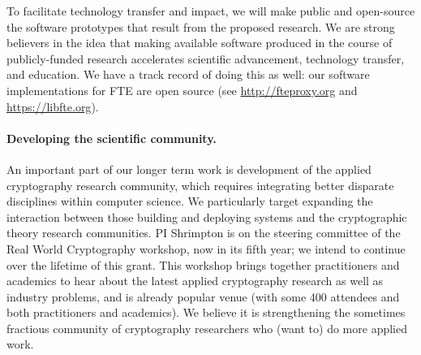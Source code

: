 To facilitate technology transfer and impact, 
we will make public and open-source the software prototypes that result from the
proposed research. We are strong believers in the idea that making available software 
produced in the course of publicly-funded research accelerates scientific
advancement, technology transfer, and education.
We have a track record of doing this as well: 
our software implementations for FTE are open
source (see \url{http://fteproxy.org} and \url{https://libfte.org}). 










\paragraph{Developing the scientific community.} An important part of our longer
term work is development of the applied cryptography research community, which
requires integrating better disparate disciplines within computer science. We
particularly target expanding the interaction between those building and
deploying systems and the cryptographic theory research communities.  PI
Shrimpton is on the steering committee of the Real World
Cryptography workshop, now in its fifth year; we intend to continue
over the lifetime of this grant.  This workshop brings
together practitioners and academics to hear about the latest applied
cryptography research as well as industry problems, and is already
popular venue (with some 400 attendees and both practitioners and
academics). We believe it is strengthening the sometimes fractious community of
cryptography researchers who (want to) do more applied work. 



